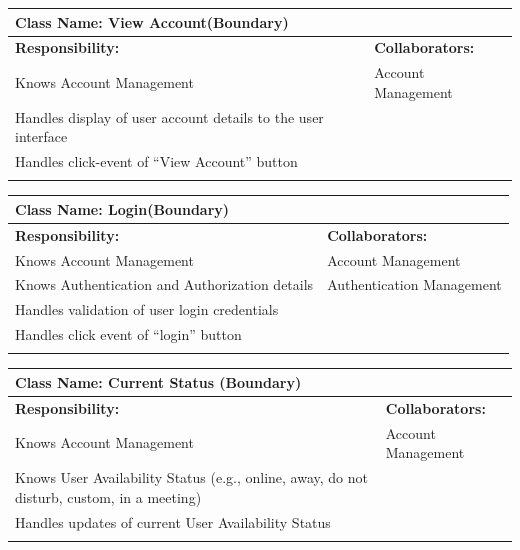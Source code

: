 \documentclass[]{article}
\begin{document}
\begin{itemize}
	\begin{table}[ht]
		\centering
		\begin{tabular}{|p{7cm}|p{7cm}|}
		\hline 
		 \multicolumn{2}{|l|}{\textbf{Class Name:} View Account(Boundary)} \\
		\hline
		\textbf{Responsibility:} & \textbf{Collaborators:} \\
		\hline
			Knows Account Management & Account Management \\
			Handles display of user account details to the user interface &\\
			Handles click-event of “View Account” button &\\
		\vspace{0.1in} & \\
		\hline
		\end{tabular}
	\end{table}

	\begin{table}[ht]
		\centering
		\begin{tabular}{|p{7cm}|p{7cm}|}
		\hline 
		 \multicolumn{2}{|l|}{\textbf{Class Name:} Login(Boundary)} \\
		\hline
		\textbf{Responsibility:} & \textbf{Collaborators:} \\
		\hline
			Knows Account Management & Account Management\\
			Knows Authentication and Authorization details & Authentication Management\\
			Handles validation of user login credentials &\\
			Handles click event of “login” button &\\
		\vspace{0.1in} & \\
		\hline
		\end{tabular}
	\end{table}

	\begin{table}[ht]
		\centering
		\begin{tabular}{|p{7cm}|p{7cm}|}
		\hline 
		 \multicolumn{2}{|l|}{\textbf{Class Name:} Current Status (Boundary)} \\
		\hline
		\textbf{Responsibility:} & \textbf{Collaborators:} \\
		\hline
			Knows Account Management & Account Management \\
			Knows User Availability Status (e.g., online, away, do not disturb, custom, in a meeting) &\\
			Handles updates of current User Availability Status &\\
		\vspace{0.1in} & \\
		\hline
		\end{tabular}
	\end{table}


\end{itemize}
\end{document}
